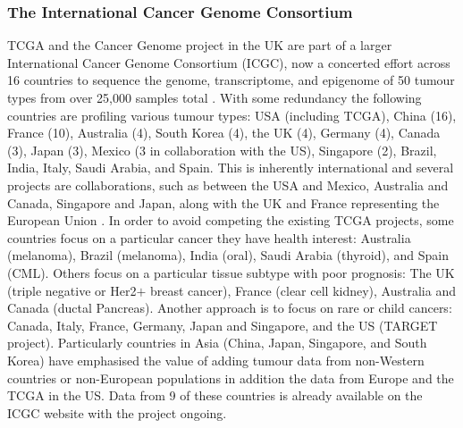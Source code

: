 \subsubsection{The International Cancer Genome Consortium}
TCGA and the Cancer Genome project in the UK are part of a larger International Cancer Genome Consortium (ICGC), now a concerted effort across 16 countries to sequence the genome, transcriptome, and epigenome of 50 tumour types from over 25,000 samples total \citep{ICGC2011}. With some redundancy the following countries are profiling various tumour types: USA (including TCGA), China (16), France (10), Australia (4), South Korea (4), the UK (4), Germany (4), Canada (3), Japan (3), Mexico (3 in collaboration with the US), Singapore (2),  Brazil, India, Italy, Saudi Arabia, and Spain. This is inherently international and several projects are collaborations, such as between the USA and Mexico, Australia and Canada, Singapore and Japan, along with the UK and France representing the European Union \citep{ICGC2017web}. In order to avoid competing the existing TCGA projects, some countries focus on a particular cancer they have health interest: Australia (melanoma), Brazil (melanoma), India (oral), Saudi Arabia (thyroid), and Spain (CML). Others focus on a particular tissue subtype with poor prognosis: The UK (triple negative or Her2$+$ breast cancer), France (clear cell kidney), Australia and Canada (ductal Pancreas). Another approach is to focus on rare or child cancers: Canada, Italy, France, Germany, Japan and Singapore, and the US (TARGET project). Particularly countries in Asia (China, Japan, Singapore, and South Korea) have emphasised the value of adding tumour data from non-Western countries or non-European populations in addition the data from Europe and the TCGA in the US. Data from 9 of these countries is already available on the ICGC website with the project ongoing.

 \label{TCGA_Findings}

